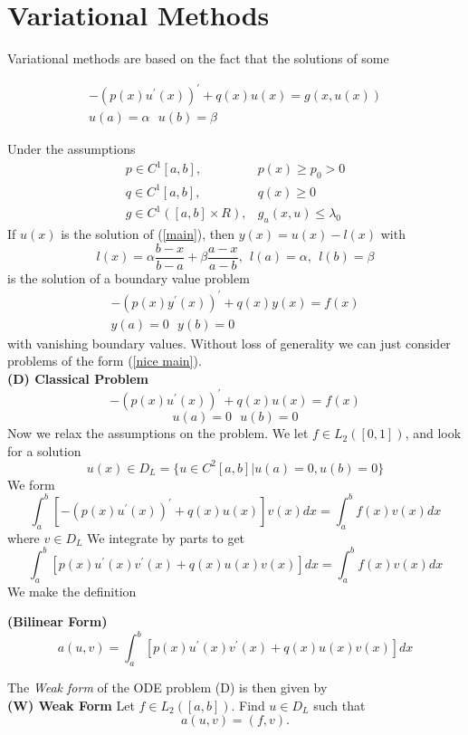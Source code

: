 \chapter{Variational Methods}

Variational methods are based on the fact  that the solutions of some 

\begin{equation} 
\label{main}
\begin{array}{lr}
 -(p(x)u^{'}(x))^{'} + q(x)u(x)=g(x,u(x))\\
u(a) = \alpha \ \ \ u(b)=\beta 

\end{array}
\end{equation}

Under the assumptions
\begin{equation} 
\begin{array}{lr}
p\in C^{1}[a,b], & p(x) \geq p_0 >0 \\
q\in C^{1}[a,b], & q(x) \geq 0 \\
g\in C^{1}([a,b]\times R), & g_u(x,u) \leq \lambda_0
\end{array}
\end{equation}
If $u(x)$ is the solution of (\ref{main}), then $y(x)=u(x)-l(x)$ with
\[l(x)=\alpha \frac{b-x}{b-a} +\beta\frac{a-x}{a-b}, \ \ l(a)=\alpha, \ \ l(b)=\beta\]
is the solution of a boundary value problem
\begin{equation} 
\label{nice main}
\begin{array}{lr}
 -(p(x)y^{'}(x))^{'} + q(x)y(x)=f(x)\\
y(a) = 0\ \ \ y(b)=0
\end{array}
\end{equation}
with vanishing boundary values. Without loss of generality we can just consider
problems of the form (\ref{nice main}).\\
\textbf{(D) Classical Problem}
\[ -(p(x)u^{'}(x))^{'} + q(x)u(x)=f(x)\]
\[u(a) = 0\ \ \ u(b)=0\]
Now we relax the assumptions on the problem.  We let $f\in L_2([0,1])$,
and look for a solution 
\[u(x) \in D_L=\{u \in C^{2}[a,b] | u(a)=0, u(b)=0 \} \]
We form 
\[\int_{a}^{b}[-(p(x)u^{'}(x))^{'} + q(x)u(x)]v(x)dx=\int_a^bf(x)v(x)dx \]
where $v\in D_L$
We integrate by parts to get
\[\int_{a}^{b}[p(x)u^{'}(x)v^{'}(x) + q(x)u(x)v(x)]dx=\int_a^bf(x)v(x)dx \]
We make the definition
\begin{definition}
\textbf{(Bilinear Form)}
\[a(u,v)=\int_{a}^{b}[p(x)u^{'}(x)v^{'}(x) + q(x)u(x)v(x)]dx\]

\end{definition}
The \textit{Weak form} of the ODE problem (D) is then given by\\
\textbf{(W) Weak Form} Let $f\in L_2([a,b])$. Find $u\in D_L$ such that
\[a(u,v)=(f,v).\]

